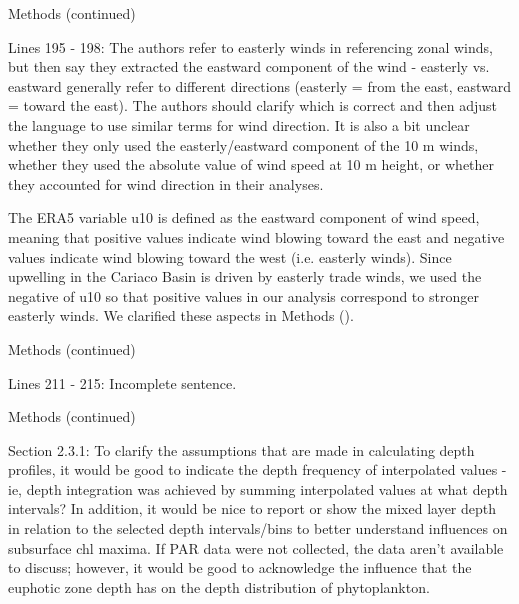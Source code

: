 \documentclass[12pt,english]{reviewresponse}
\begin{document}
\begin{revcomment}
	Methods (continued)

    Lines 195 - 198: The authors refer to easterly winds in referencing zonal winds, but then say they extracted the eastward component of the wind - easterly vs. eastward generally refer to different directions (easterly = from the east, eastward = toward the east). The authors should clarify which is correct and then adjust the language to use similar terms for wind direction. It is also a bit unclear whether they only used the easterly/eastward component of the 10 m winds, whether they used the absolute value of wind speed at 10 m height, or whether they accounted for wind direction in their analyses.
\end{revcomment}
\begin{revresponse}
	The ERA5 variable u10 is defined as the eastward component of wind speed, meaning that positive values indicate wind blowing toward the east and negative values indicate wind blowing toward the west (i.e. easterly winds). Since upwelling in the Cariaco Basin is driven by easterly trade winds, we used the negative of u10 so that positive values in our analysis correspond to stronger easterly winds. We clarified these aspects in Methods ().
\end{revresponse}


\begin{revcomment}
	Methods (continued)

    Lines 211 - 215: Incomplete sentence.
\end{revcomment}
\begin{revresponse}
\end{revresponse}

\begin{revcomment}
	Methods (continued)

    Section 2.3.1: To clarify the assumptions that are made in calculating depth profiles, it would be good to indicate the depth frequency of interpolated values - ie, depth integration was achieved by summing interpolated values at what depth intervals? In addition, it would be nice to report or show the mixed layer depth in relation to the selected depth intervals/bins to better understand influences on subsurface chl maxima. If PAR data were not collected, the data aren’t available to discuss; however, it would be good to acknowledge the influence that the euphotic zone depth has on the depth distribution of phytoplankton.
\end{revcomment}
\end{document}
